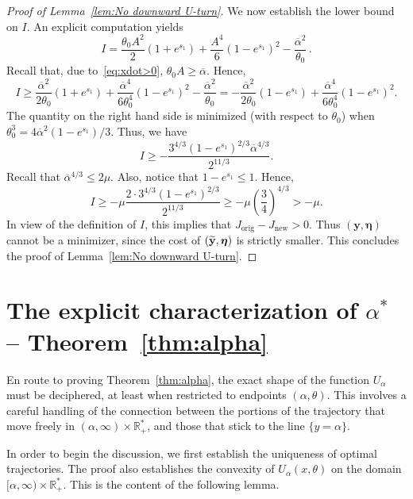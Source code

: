 \documentclass[AHL,Unicode,longabstracts]{cedram}
\newcommand{\orig}{\mathrm{orig}}
\newcommand{\new}{\mathrm{new}}
\newcommand{\R}{\mathbb{R}}
\newcommand{\by}{\mathbf{y}}
\newcommand{\beeta}{\boldsymbol{\eta}}
\newcommand{\1}{\mathds{1}}
\let\oldtilde\tilde
\renewcommand*{\tilde}[1]{\mathchoice{\widetilde{#1}}{\widetilde{#1}}{\oldtilde{#1}}{\oldtilde{#1}}}
\begin{document}
\begin{proof}[Proof of Lemma~\ref{lem:No downward U-turn}]
We now establish the lower bound on $I$. An explicit computation yields
\begin{equation*}
I = \frac{\theta_0 A^2}2 \left(1+e^{s_1}\right) + \frac{A^4}{6} \left(1 - e^{s_1}\right)^2 - \frac{\overline\alpha^2}{\theta_0}\,.
\end{equation*}
Recall that, due to~\eqref{eq:xdot>0}, $\theta_0 A \geq \overline\alpha$. Hence,
\[
I \geq \frac{\overline\alpha^2}{2\theta_0} \left(1+e^{s_1}\right) + \frac{\overline\alpha^4}{6 \theta_0^4}\left(1 - e^{s_1}\right)^2 - \frac{\overline\alpha^2}{\theta_0} = -\frac{\overline\alpha^2}{2\theta_0}\left(1-e^{s_1}\right) + \frac{\overline\alpha^4}{6 \theta_0^4}\left(1 - e^{s_1}\right)^2.
\]
The quantity on the right hand side is minimized (with respect to $\theta_0$) when $\theta_0^3 = 4\overline\alpha^2(1-e^{s_1})/3$. Thus, we have
\begin{equation*}
I \geq -\frac{3^{4/3}\left(1-e^{s_1}\right)^{2/3}\overline\alpha^{4/3}}{2^{11/3}}.
\end{equation*}
Recall that $\overline\alpha^{4/3}\leq 2\mu$. Also, notice that $1-e^{s_1}\leq 1$. Hence,
\[
I \geq -\mu \frac{2 \cdot 3^{4/3} (1-e^{s_1})^{2/3}}{2^{11/3}}
\geq -\mu \left(\frac{3}{4}\right)^{4/3} > - \mu.
\]
In view of the definition of $I$, this implies that $J_{\orig} - J_{\new} > 0$. Thus $(\by,\beeta)$ cannot be a minimizer, since the cost of $(\tilde \by, \beeta)$ is strictly smaller. This concludes the proof of Lemma~\ref{lem:No downward U-turn}.
\end{proof}



\section{The explicit characterization of \texorpdfstring{$\alpha^*$}{alpha*} -- Theorem~\ref{thm:alpha}}
\label{sec:alpha^*}



En route to proving Theorem~\ref{thm:alpha}, the exact shape of the function $U_\alpha$ must be deciphered, at least when restricted to endpoints $(\alpha,\theta)$. This involves a careful handling of the connection between the portions of the trajectory that move freely in $(\alpha,\infty)\times \R_+^*$, and those that stick to the line $\{y = \alpha\}$.


In order to begin the discussion, we first establish the uniqueness of optimal trajectories. The proof also establishes the convexity of $U_\alpha(x,\theta)$ on the domain $[\alpha,\infty)\times\R_+^*$. This is the content of the following lemma.
\end{document}
